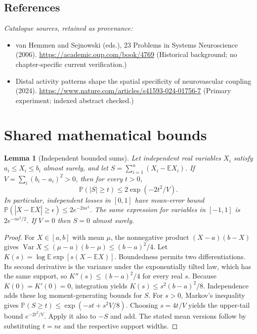 \documentclass[11pt]{article}
\newcommand{\E}{\mathbb E}
\newcommand{\Prob}{\mathbb P}
\DeclareMathOperator{\Var}{Var}
\providecommand{\E}{\mathbb E}
\providecommand{\Prob}{\mathbb P}
\providecommand{\Var}{\operatorname{Var}}
\newtheorem{sharedlemma}{Lemma}[section]
\begin{document}
\subsection{References}
\noindent\emph{Catalogue sources, retained as provenance:}
\begin{itemize}
\item van Hemmen and Sejnowski (eds.), 23 Problems in Systems Neuroscience (2006). \url{https://academic.oup.com/book/4769} (Historical background; no chapter-specific current verification.)
\item Distal activity patterns shape the spatial specificity of neurovascular coupling (2024). \url{https://www.nature.com/articles/s41593-024-01756-7} (Primary experiment; indexed abstract checked.)
\end{itemize}
\clearpage


\appendix
\section{Shared mathematical bounds}\label{app:bounds}
\begin{sharedlemma}[Independent bounded sums]\label{lem:bounded}
Let independent real variables $X_i$ satisfy $a_i\leq X_i\leq b_i$ almost surely,
and let $S=\sum_{i=1}^n(X_i-\E X_i)$. If
$V=\sum_i(b_i-a_i)^2>0$, then for every $t>0$,
\[
 \Prob(|S|\geq t)\leq 2\exp(-2t^2/V).
\]
In particular, independent losses in $[0,1]$ have mean-error bound
$\Prob(|\overline X-\E\overline X|\geq\epsilon)
\leq2e^{-2n\epsilon^2}$. The same expression for variables in $[-1,1]$
is $2e^{-n\epsilon^2/2}$. If $V=0$ then $S=0$ almost surely.
\end{sharedlemma}
\begin{proof}
For $X\in[a,b]$ with mean $\mu$, the nonnegative product
$(X-a)(b-X)$ gives
$\Var X\leq(\mu-a)(b-\mu)\leq(b-a)^2/4$.
Let $K(s)=\log\E\exp[s(X-\E X)]$.
Boundedness permits two differentiations. Its second derivative is the variance
under the exponentially tilted law, which has the same support, so
$K''(s)\leq(b-a)^2/4$ for every real $s$.
Because $K(0)=K'(0)=0$, integration yields
$K(s)\leq s^2(b-a)^2/8$.
Independence adds these log moment-generating bounds for $S$.
For $s>0$, Markov's inequality gives
$\Prob(S\geq t)\leq\exp(-st+s^2V/8)$.
Choosing $s=4t/V$ yields the upper-tail bound $e^{-2t^2/V}$.
Apply it also to $-S$ and add. The stated mean versions follow by substituting
$t=n\epsilon$ and the respective support widths.
\end{proof}
\end{document}
